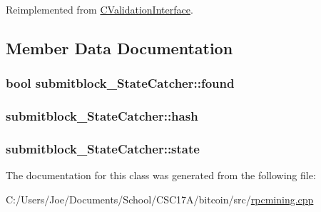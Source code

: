 Reimplemented from \hyperlink{class_c_validation_interface_aeb34ef6814685cabc29062ed7be25441}{C\+Validation\+Interface}.



\subsection{Member Data Documentation}
\hypertarget{classsubmitblock___state_catcher_a61c0d03544cd4495534bdb0b52f36886}{}
\subsubsection[{found}]{\setlength{\rightskip}{0pt plus 5cm}bool submitblock\+\_\+\+State\+Catcher\+::found}\label{classsubmitblock___state_catcher_a61c0d03544cd4495534bdb0b52f36886}
\hypertarget{classsubmitblock___state_catcher_adcc822af0b1305bcda71f8e9656c4239}{}
\subsubsection[{hash}]{ submitblock\+\_\+\+State\+Catcher\+::hash}\label{classsubmitblock___state_catcher_adcc822af0b1305bcda71f8e9656c4239}
\hypertarget{classsubmitblock___state_catcher_a78357802ab8d143f6f21929e0aa2d727}{}
\subsubsection[{state}]{ submitblock\+\_\+\+State\+Catcher\+::state}\label{classsubmitblock___state_catcher_a78357802ab8d143f6f21929e0aa2d727}


The documentation for this class was generated from the following file\+:\begin{DoxyCompactItemize}
\item 
C\+:/\+Users/\+Joe/\+Documents/\+School/\+C\+S\+C17\+A/bitcoin/src/\hyperlink{rpcmining_8cpp}{rpcmining.\+cpp}\end{DoxyCompactItemize}
